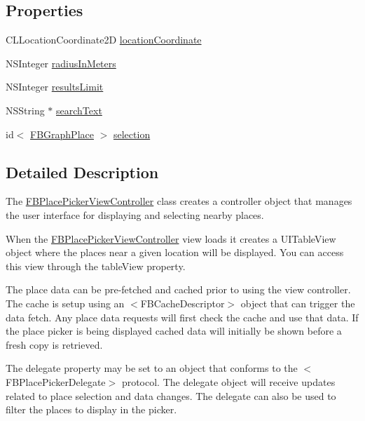 \subsection*{Properties}
\begin{DoxyCompactItemize}
\item 
C\+L\+Location\+Coordinate2D \hyperlink{interfaceFBPlacePickerViewController_a67ede6488ef520c82a4bea945cffae0b}{location\+Coordinate}
\item 
N\+S\+Integer \hyperlink{interfaceFBPlacePickerViewController_ae0a9e348ccf057d2d307263bde87d496}{radius\+In\+Meters}
\item 
N\+S\+Integer \hyperlink{interfaceFBPlacePickerViewController_a8fa93f7498cf329da782ac179771c691}{results\+Limit}
\item 
N\+S\+String $\ast$ \hyperlink{interfaceFBPlacePickerViewController_a7e3a460b20cefff01be9400b18a4cfc9}{search\+Text}
\item 
id$<$ \hyperlink{protocolFBGraphPlace-p}{F\+B\+Graph\+Place} $>$ \hyperlink{interfaceFBPlacePickerViewController_a2b28bd3f9ab163b1659434d8d5327039}{selection}
\end{DoxyCompactItemize}


\subsection{Detailed Description}
The {\ttfamily \hyperlink{interfaceFBPlacePickerViewController}{F\+B\+Place\+Picker\+View\+Controller}} class creates a controller object that manages the user interface for displaying and selecting nearby places.

When the {\ttfamily \hyperlink{interfaceFBPlacePickerViewController}{F\+B\+Place\+Picker\+View\+Controller}} view loads it creates a {\ttfamily U\+I\+Table\+View} object where the places near a given location will be displayed. You can access this view through the {\ttfamily table\+View} property.

The place data can be pre-\/fetched and cached prior to using the view controller. The cache is setup using an $<$\+F\+B\+Cache\+Descriptor$>$ object that can trigger the data fetch. Any place data requests will first check the cache and use that data. If the place picker is being displayed cached data will initially be shown before a fresh copy is retrieved.

The {\ttfamily delegate} property may be set to an object that conforms to the $<$\+F\+B\+Place\+Picker\+Delegate$>$ protocol. The {\ttfamily delegate} object will receive updates related to place selection and data changes. The delegate can also be used to filter the places to display in the picker. 


